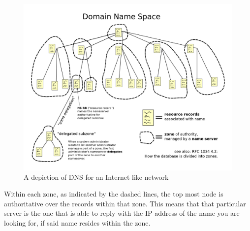			\begin{figure}[htb]
				\centering
					\includegraphics[scale=0.27]{./DNSTree.png}
					\caption{A depiction of DNS for an Internet like network}
					\label{fig:DNSTree}
			\end{figure}

			Within each zone, as indicated by the dashed lines, the top most node is authoritative over the records within that zone.
			This means that that particular server is the one that is able to reply with the IP address of the name you are looking for, if said name resides within the zone.
